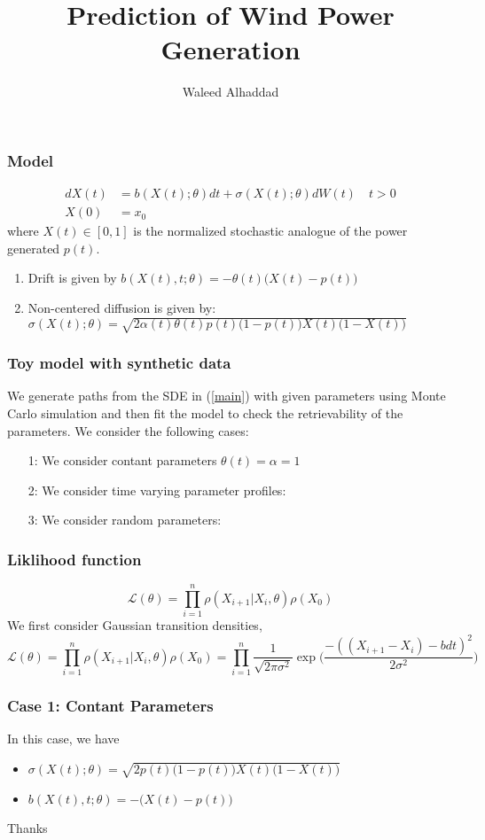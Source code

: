 \documentclass[aspectratio=169]{beamer}\usepackage[utf8]{inputenc}
\title{Prediction of Wind Power Generation}
\subtitle{ Waleed Alhaddad}
\begin{document}
\begin{frame}
\titlepage
\end{frame}

\begin{frame}\frametitle{Model}

\begin{equation}
\begin{split}
dX(t) &= b(X(t); \theta) dt + \sigma (X(t); \theta ) dW(t) \quad t > 0 \\
X(0) & = x_0
\end{split}\label{main}
\end{equation}
where $X(t) \in [0,1]$ is the normalized stochastic analogue of the power generated $p(t)$. 

\begin{enumerate}
\item Drift is given by $b(X(t),t ; \theta) = - \theta (t) \Big(X(t)-p(t)\Big)$
\item Non-centered diffusion is given by: $ \sigma (X(t); \theta) = \sqrt{2\alpha(t) \theta (t) p(t) \Big(1-p(t)\Big) X(t) \Big(1-X(t)\Big)}  $
\end{enumerate}

\end{frame}

\begin{frame}\frametitle{ Toy model with synthetic data }
We generate paths from the SDE in (\ref{main}) with given parameters using Monte Carlo simulation and then fit the model to check the retrievability of the parameters. We consider the following cases:
\begin{itemize}
\item[1:] We consider contant parameters $\theta (t) = \alpha  = 1$
\item[2:] We consider time varying parameter profiles: 
\item[3:] We consider random parameters:
\end{itemize}
\end{frame}

\begin{frame}\frametitle{ Liklihood function }

\begin{equation}
\mathcal{L}(\theta) = \prod\limits_{i=1}^n\rho( {X_{i+1}|X_{i}}, \theta)  \rho(X_0) 
\end{equation}
We first consider Gaussian transition densities,
\begin{equation}
\mathcal{L}(\theta) = \prod\limits_{i=1}^n     \rho( {X_{i+1}|X_{i}}, \theta)  \rho(X_0) = \prod\limits_{i=1}^n  \frac{1}{\sqrt{2 \pi \sigma^2}} \exp\Big(\frac{-((X_{i+1}-X_i) - bdt )^2}{2\sigma^2}\Big)
\end{equation}

\end{frame}

\begin{frame}\frametitle{ Case 1: Contant Parameters }
In this case, we have
\begin{itemize}
\item $ \sigma (X(t); \theta) = \sqrt{2 p(t) \Big(1-p(t)\Big) X(t) \Big(1-X(t)\Big)}  $
\item $b(X(t),t ; \theta) = -  \Big(X(t)-p(t)\Big)$
\end{itemize}


\end{frame}



\begin{frame}
Thanks
\end{frame}
\end{document}
